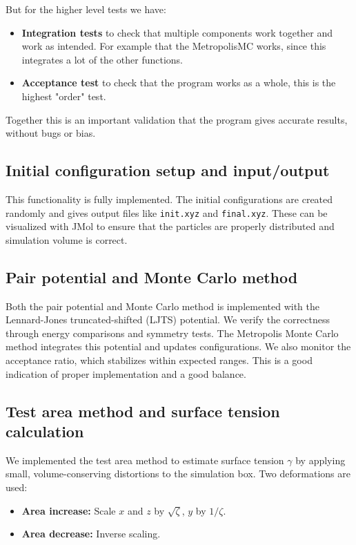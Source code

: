 \documentclass{article}
\begin{document}
But for the higher level tests we have:

\begin{itemize}
    \item \textbf{Integration tests} to check that multiple components work together and work as intended. For example that the MetropolisMC works, since this integrates a lot of the other functions.
    \item \textbf{Acceptance test} to check that the program works as a whole, this is the highest "order" test.
\end{itemize}

Together this is an important validation that the program gives accurate results, without bugs or bias. 

\subsection*{Initial configuration setup and input/output}

This functionality is fully implemented. The initial configurations are created randomly and gives output files like \texttt{init.xyz} and \texttt{final.xyz}. These can be visualized with JMol to ensure that the particles are properly distributed and simulation volume is correct.

\subsection*{Pair potential and Monte Carlo method}

Both the pair potential and Monte Carlo method is implemented with the Lennard-Jones truncated-shifted (LJTS) potential. We verify the correctness through energy comparisons and symmetry tests. The Metropolis Monte Carlo method integrates this potential and updates configurations. We also monitor the acceptance ratio, which stabilizes within expected ranges. This is a good indication of proper implementation and a good balance. 

\subsection*{Test area method and surface tension calculation}

We implemented the test area method to estimate surface tension $\gamma$ by applying small, volume-conserving distortions to the simulation box. Two deformations are used:
\begin{itemize}
    \item \textbf{Area increase:} Scale $x$ and $z$ by $\sqrt{\zeta}$, $y$ by $1/\zeta$.
    \item \textbf{Area decrease:} Inverse scaling.
\end{itemize}
\end{document}
